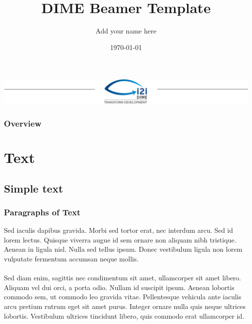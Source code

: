 \documentclass[aspectratio=169]{beamer} %
\title{DIME Beamer Template}
\author{Add your name here}
\institute{DIME - World Bank}
\date{\today}
\begin{document}
\begin{frame}
	\includegraphics[width=\textwidth]{img/Header.png}
	\vspace{-0.2cm}
	\titlepage 	 %
\end{frame}

\begin{frame}
\frametitle{Overview} %
\tableofcontents %
\end{frame}

\section{Text}
\subsection{Simple text}

\begin{frame}
\frametitle{Paragraphs of Text}
Sed iaculis dapibus gravida. Morbi sed tortor erat, nec interdum arcu. Sed id lorem lectus. Quisque viverra augue id sem ornare non aliquam nibh tristique. Aenean in ligula nisl. Nulla sed tellus ipsum. Donec vestibulum ligula non lorem vulputate fermentum accumsan neque mollis.\\~\\

Sed diam enim, sagittis nec condimentum sit amet, ullamcorper sit amet libero. Aliquam vel dui orci, a porta odio. Nullam id suscipit ipsum. Aenean lobortis commodo sem, ut commodo leo gravida vitae. Pellentesque vehicula ante iaculis arcu pretium rutrum eget sit amet purus. Integer ornare nulla quis neque ultrices lobortis. Vestibulum ultrices tincidunt libero, quis commodo erat ullamcorper id.
\end{frame}
\end{document}
